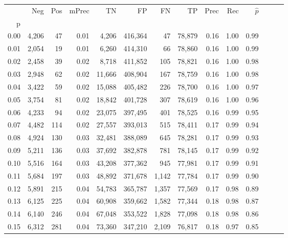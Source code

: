 \begin{tabular}{rrrrrrrrrrrrrr}
\toprule
{} &    Neg &    Pos & mPrec &       TN &       FP &      FN &      TP &  Prec &   Rec & $\hat{p}$ \\
p    &        &        &       &          &          &         &         &       &       &           \\
\midrule
0.00 &  4,206 &     47 &  0.01 &    4,206 &  416,364 &      47 &  78,879 &  0.16 &  1.00 &      0.99 \\
0.01 &  2,054 &     19 &  0.01 &    6,260 &  414,310 &      66 &  78,860 &  0.16 &  1.00 &      0.99 \\
0.02 &  2,458 &     39 &  0.02 &    8,718 &  411,852 &     105 &  78,821 &  0.16 &  1.00 &      0.98 \\
0.03 &  2,948 &     62 &  0.02 &   11,666 &  408,904 &     167 &  78,759 &  0.16 &  1.00 &      0.98 \\
0.04 &  3,422 &     59 &  0.02 &   15,088 &  405,482 &     226 &  78,700 &  0.16 &  1.00 &      0.97 \\
0.05 &  3,754 &     81 &  0.02 &   18,842 &  401,728 &     307 &  78,619 &  0.16 &  1.00 &      0.96 \\
0.06 &  4,233 &     94 &  0.02 &   23,075 &  397,495 &     401 &  78,525 &  0.16 &  0.99 &      0.95 \\
0.07 &  4,482 &    114 &  0.02 &   27,557 &  393,013 &     515 &  78,411 &  0.17 &  0.99 &      0.94 \\
0.08 &  4,924 &    130 &  0.03 &   32,481 &  388,089 &     645 &  78,281 &  0.17 &  0.99 &      0.93 \\
0.09 &  5,211 &    136 &  0.03 &   37,692 &  382,878 &     781 &  78,145 &  0.17 &  0.99 &      0.92 \\
0.10 &  5,516 &    164 &  0.03 &   43,208 &  377,362 &     945 &  77,981 &  0.17 &  0.99 &      0.91 \\
0.11 &  5,684 &    197 &  0.03 &   48,892 &  371,678 &   1,142 &  77,784 &  0.17 &  0.99 &      0.90 \\
0.12 &  5,891 &    215 &  0.04 &   54,783 &  365,787 &   1,357 &  77,569 &  0.17 &  0.98 &      0.89 \\
0.13 &  6,125 &    225 &  0.04 &   60,908 &  359,662 &   1,582 &  77,344 &  0.18 &  0.98 &      0.87 \\
0.14 &  6,140 &    246 &  0.04 &   67,048 &  353,522 &   1,828 &  77,098 &  0.18 &  0.98 &      0.86 \\
0.15 &  6,312 &    281 &  0.04 &   73,360 &  347,210 &   2,109 &  76,817 &  0.18 &  0.97 &      0.85 \\

\end{tabular}
